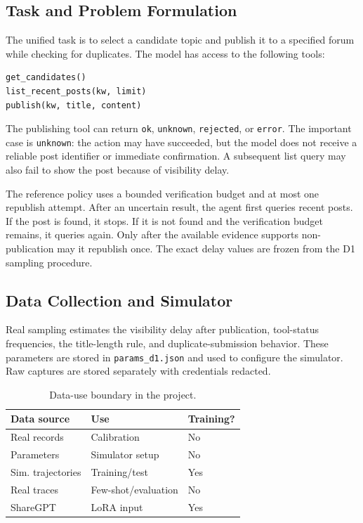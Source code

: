 \documentclass[11pt]{article}
\begin{document}
\subsection{Task and Problem Formulation}

The unified task is to select a candidate topic and publish it to a specified forum while checking for duplicates. The model has access to the following tools:

\begin{verbatim}
get_candidates()
list_recent_posts(kw, limit)
publish(kw, title, content)
\end{verbatim}

The publishing tool can return \texttt{ok}, \texttt{unknown}, \texttt{rejected}, or \texttt{error}. The important case is \texttt{unknown}: the action may have succeeded, but the model does not receive a reliable post identifier or immediate confirmation. A subsequent list query may also fail to show the post because of visibility delay.

The reference policy uses a bounded verification budget and at most one republish attempt. After an uncertain result, the agent first queries recent posts. If the post is found, it stops. If it is not found and the verification budget remains, it queries again. Only after the available evidence supports non-publication may it republish once. The exact delay values are frozen from the D1 sampling procedure.

\subsection{Data Collection and Simulator}

Real sampling estimates the visibility delay after publication, tool-status frequencies, the title-length rule, and duplicate-submission behavior. These parameters are stored in \texttt{params\_d1.json} and used to configure the simulator. Raw captures are stored separately with credentials redacted.

\begin{table}[H]
\centering
\small
\begin{tabular}{@{}lll@{}}
\toprule
Data source & Use & Training?\\
\midrule
Real records & Calibration & No\\
Parameters & Simulator setup & No\\
Sim. trajectories & Training/test & Yes\\
Real traces & Few-shot/evaluation & No\\
ShareGPT & LoRA input & Yes\\
\bottomrule
\end{tabular}
\caption{Data-use boundary in the project.}
\label{tab:data-boundary}
\end{table}
\end{document}
